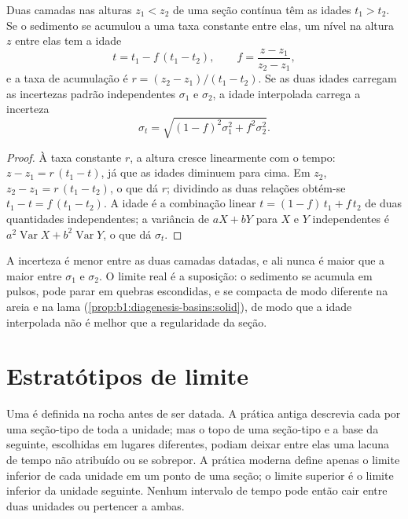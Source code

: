 \begin{proposition}\label{prop:b1:stratigraphic-scale:interpolation}
Duas camadas nas alturas $z_1 < z_2$ de uma seção contínua têm as idades $t_1 > t_2$. Se o
sedimento se acumulou a uma taxa constante entre elas, um nível na altura $z$ entre elas tem a
idade
\[
  t = t_1 - f\,(t_1 - t_2), \qquad f = \frac{z - z_1}{z_2 - z_1},
\]
e a taxa de acumulação é $r = (z_2 - z_1)/(t_1 - t_2)$. Se as duas idades carregam as
incertezas padrão independentes $\sigma_1$ e $\sigma_2$, a idade interpolada carrega a incerteza
\[
  \sigma_t = \sqrt{(1 - f)^2 \sigma_1^2 + f^2 \sigma_2^2}.
\]
\end{proposition}

\begin{proof}
À taxa constante $r$, a altura cresce linearmente com o tempo: $z - z_1 = r\,(t_1
- t)$, já que as idades diminuem para cima. Em $z_2$, $z_2 - z_1 = r\,(t_1 - t_2)$, o que
dá $r$; dividindo as duas relações obtém-se $t_1 - t = f\,(t_1 - t_2)$. A idade é a
combinação linear $t = (1 - f)\,t_1 + f\,t_2$ de duas quantidades independentes; a variância
de $a X + b Y$ para $X$ e $Y$ independentes é $a^2
\operatorname{Var} X + b^2 \operatorname{Var} Y$, o que dá $\sigma_t$.
\end{proof}

A incerteza é menor entre as duas camadas datadas, e ali nunca é maior que a maior entre
$\sigma_1$ e $\sigma_2$. O limite real é a suposição: o sedimento se acumula em pulsos, pode
parar em quebras escondidas, e se compacta de modo diferente na areia e na lama
(\cref{prop:b1:diagenesis-basins:solid}), de modo que a idade interpolada não é melhor que a
regularidade da seção.

\section{Estratótipos de limite}\label{sec:b1:stratigraphic-scale:gssp}

Uma  é definida na rocha antes de ser datada. A prática antiga
descrevia cada  por uma seção-tipo de toda a unidade; mas o topo de uma seção-tipo e a
base da seguinte, escolhidas em lugares diferentes, podiam deixar entre elas uma lacuna de
tempo não atribuído ou se sobrepor. A prática moderna define apenas o limite inferior de cada
unidade em um ponto de uma seção; o limite superior é o limite inferior da unidade seguinte.
Nenhum intervalo de tempo pode então cair entre duas unidades ou pertencer a ambas.

